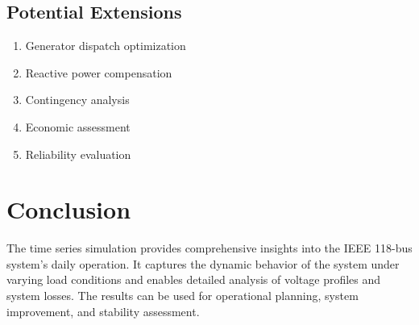 \documentclass[11pt]{article}
\begin{document}
\subsection{Potential Extensions}
\begin{enumerate}
    \item Generator dispatch optimization
    \item Reactive power compensation
    \item Contingency analysis
    \item Economic assessment
    \item Reliability evaluation
\end{enumerate}

\section{Conclusion}
The time series simulation provides comprehensive insights into the IEEE 118-bus system's daily operation. It captures the dynamic behavior of the system under varying load conditions and enables detailed analysis of voltage profiles and system losses. The results can be used for operational planning, system improvement, and stability assessment.
\end{document}
